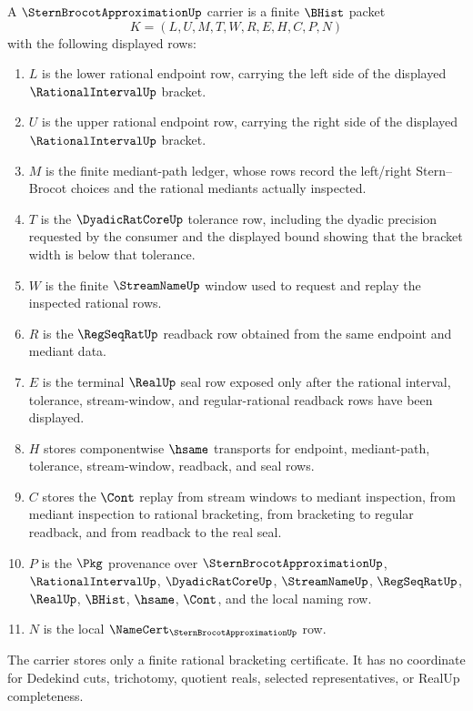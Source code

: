 \begin{definition}\label{def:stern-brocot-approximation-carrier}
A $\SternBrocotApproximationUp$ carrier is a finite $\BHist$ packet
$$
K=(L,U,M,T,W,R,E,H,C,P,N)
$$
with the following displayed rows:
\begin{enumerate}
\item $L$ is the lower rational endpoint row, carrying the left side of the displayed $\RationalIntervalUp$ bracket.
\item $U$ is the upper rational endpoint row, carrying the right side of the displayed $\RationalIntervalUp$ bracket.
\item $M$ is the finite mediant-path ledger, whose rows record the left/right Stern--Brocot choices and the rational mediants actually inspected.
\item $T$ is the $\DyadicRatCoreUp$ tolerance row, including the dyadic precision requested by the consumer and the displayed bound showing that the bracket width is below that tolerance.
\item $W$ is the finite $\StreamNameUp$ window used to request and replay the inspected rational rows.
\item $R$ is the $\RegSeqRatUp$ readback row obtained from the same endpoint and mediant data.
\item $E$ is the terminal $\RealUp$ seal row exposed only after the rational interval, tolerance, stream-window, and regular-rational readback rows have been displayed.
\item $H$ stores componentwise $\hsame$ transports for endpoint, mediant-path, tolerance, stream-window, readback, and seal rows.
\item $C$ stores the $\Cont$ replay from stream windows to mediant inspection, from mediant inspection to rational bracketing, from bracketing to regular readback, and from readback to the real seal.
\item $P$ is the $\Pkg$ provenance over $\SternBrocotApproximationUp$, $\RationalIntervalUp$, $\DyadicRatCoreUp$, $\StreamNameUp$, $\RegSeqRatUp$, $\RealUp$, $\BHist$, $\hsame$, $\Cont$, and the local naming row.
\item $N$ is the local $\NameCert_{\SternBrocotApproximationUp}$ row.
\end{enumerate}
The carrier stores only a finite rational bracketing certificate. It has no coordinate for Dedekind cuts, trichotomy, quotient reals, selected representatives, or RealUp completeness.
\end{definition}

